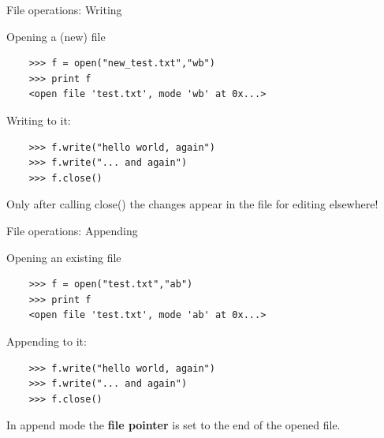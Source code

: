 \documentclass[xcolor=table,10pt,handout]{beamer}
\begin{document}
\begin{frame}[fragile]{File operations: Writing}

  Opening a (new) file 

  \begin{verbatim}
    >>> f = open("new_test.txt","wb")
    >>> print f
    <open file 'test.txt', mode 'wb' at 0x...>
  \end{verbatim}
  \bigskip
  \pause
  Writing to it:
  \begin{verbatim}
    >>> f.write("hello world, again")
    >>> f.write("... and again")
    >>> f.close()
  \end{verbatim}
  \pause
  \vspace{0.65cm}

  \begin{arrowlist}
  \item Only after calling close() the changes appear in the file for
    editing elsewhere!
  \end{arrowlist}

\end{frame}

\begin{frame}[fragile]{File operations: Appending}

  Opening an existing file 

  \begin{verbatim}
    >>> f = open("test.txt","ab")
    >>> print f
    <open file 'test.txt', mode 'ab' at 0x...>
  \end{verbatim}
  \bigskip
  \pause  

  Appending to it:
  \begin{verbatim}
    >>> f.write("hello world, again")
    >>> f.write("... and again")
    >>> f.close()
  \end{verbatim}
  \pause
  \vspace{0.8cm}

  \begin{arrowlist}
  \item In append mode the \textbf{file pointer} is set to the end of the opened file.
  \end{arrowlist}

\end{frame}
\end{document}
